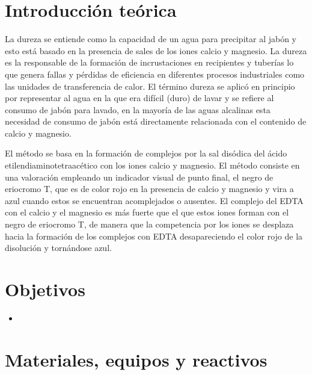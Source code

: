 
\section{Introducción teórica}

La dureza se entiende como la capacidad de un agua para precipitar al jabón y esto está basado en la presencia de sales de los iones calcio y magnesio. La dureza es la responsable de la formación de incrustaciones en recipientes y tuberías lo que genera fallas y pérdidas de eficiencia en diferentes procesos industriales como las unidades de transferencia de calor. El término dureza se aplicó en principio por representar al agua en la que era difícil (duro) de lavar y se refiere al consumo de jabón para lavado, en la mayoría de las aguas alcalinas esta necesidad de consumo de jabón está directamente relacionada con el contenido de calcio y magnesio.

El método se basa en la formación de complejos por la sal disódica del ácido etilendiaminotetraacético con los iones calcio y magnesio. El método consiste en una valoración empleando un indicador visual de punto final, el negro de eriocromo T, que es de color rojo en la presencia de calcio y magnesio y vira a azul cuando estos se encuentran acomplejados o ausentes. El complejo del EDTA con el calcio y el magnesio es más fuerte que el que estos iones forman con el negro de eriocromo T, de manera que la competencia por los iones se desplaza hacia la formación de los complejos con EDTA desapareciendo el color rojo de la disolución y tornándose azul.

\section{Objetivos}

\begin{itemize}
    \item 
\end{itemize}

\section{Materiales, equipos y reactivos}

